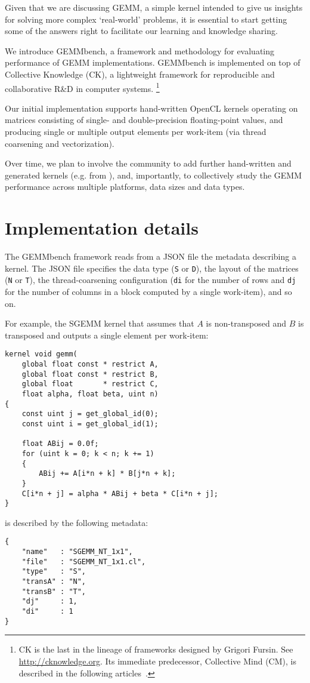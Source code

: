 \documentclass{acm_proc_article-sp} %
\begin{document}
Given that we are discussing GEMM, a simple kernel intended to
give us insights for solving more complex `real-world' problems, it is
essential to start getting some of the answers right to facilitate our learning
and knowledge sharing.

We introduce GEMMbench, a framework and methodology for evaluating performance
of GEMM implementations.
%
GEMMbench is implemented on top of Collective Knowledge (CK), a lightweight
framework for reproducible and collaborative R\&D in computer systems.%
\footnote{CK is the last in the lineage of frameworks designed by Grigori
Fursin. See \url{http://cknowledge.org}. Its immediate predecessor, Collective
Mind (CM), is described in the following articles~\cite{CollectiveMind,
CollectiveMind2}.}

Our initial implementation supports hand-written OpenCL kernels operating on
matrices consisting of single- and double-precision floating-point values, and
producing single or multiple output elements per work-item (via thread
coarsening and vectorization).

Over time, we plan to involve the community to add further hand-written and
generated kernels (e.g. from \cite{Beaugnon:2014,Steuwer:2015}), and,
importantly, to collectively study the GEMM performance across multiple
platforms, data sizes and data types.


\section{Implementation details}
\label{sec:details}

%
The GEMMbench framework reads from a JSON file the metadata describing a
kernel.
%
The JSON file specifies the data type ({\tt S} or {\tt D}), the layout of the
matrices ({\tt N} or {\tt T}), the thread-coarsening configuration ({\tt di}
for the number of rows and {\tt dj} for the number of columns in a block
computed by a single work-item), and so on.

For example, the SGEMM kernel that assumes that $A$ is non-transposed and $B$
is transposed and outputs a single element per work-item:
%
\begin{verbatim}
kernel void gemm(
    global float const * restrict A,
    global float const * restrict B,
    global float       * restrict C,
    float alpha, float beta, uint n)
{
    const uint j = get_global_id(0);
    const uint i = get_global_id(1);

    float ABij = 0.0f;
    for (uint k = 0; k < n; k += 1)
    {
        ABij += A[i*n + k] * B[j*n + k];
    }
    C[i*n + j] = alpha * ABij + beta * C[i*n + j];
}
\end{verbatim}
%
is described by the following metadata:
%
\begin{verbatim}
{
    "name"   : "SGEMM_NT_1x1",
    "file"   : "SGEMM_NT_1x1.cl",
    "type"   : "S",
    "transA" : "N",
    "transB" : "T",
    "dj"     : 1,
    "di"     : 1
}
\end{verbatim}
\end{document}
